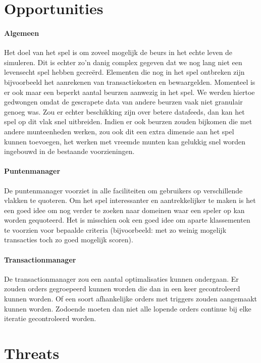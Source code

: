 \section{Opportunities}

\paragraph{Algemeen} Het doel van het spel is om zoveel mogelijk de beurs in het echte leven de simuleren. Dit is echter zo'n danig complex gegeven dat we nog lang niet een levensecht spel hebben gecre\"erd. Elementen die nog in het spel ontbreken zijn bijvoorbeeld het aanrekenen van transactiekosten en bewaargelden. 
Momenteel is er ook maar een beperkt aantal beurzen aanwezig in het spel. We werden hiertoe gedwongen omdat de gescrapete data van andere beurzen vaak niet granulair genoeg was. Zou er echter beschikking zijn over betere datafeeds, dan kan het spel op dit vlak snel uitbreiden. Indien er ook beurzen zouden bijkomen die met andere munteenheden werken, zou ook dit een extra dimensie aan het spel kunnen toevoegen, het werken met vreemde munten kan gelukkig snel worden ingebouwd in de bestaande voorzieningen.

\paragraph{Puntenmanager} De puntenmanager voorziet in alle faciliteiten om gebruikers op verschillende vlakken te quoteren. Om het spel interessanter en aantrekkelijker te maken is het een goed idee om nog verder te zoeken naar domeinen waar een speler op kan worden gequoteerd. Het is misschien ook een goed idee om aparte klassementen te voorzien voor bepaalde criteria (bijvoorbeeld: met zo weinig mogelijk transacties toch zo goed mogelijk scoren).

\paragraph{Transactionmanager} De transactionmanager zou een aantal optimalisaties kunnen ondergaan. Er zouden orders gegroepeerd kunnen worden die dan in een keer gecontroleerd kunnen worden. Of een soort afhankelijke orders met triggers zouden aangemaakt kunnen worden. Zodoende moeten dan niet alle lopende orders continue bij elke iteratie gecontroleerd worden.


\section{Threats}


